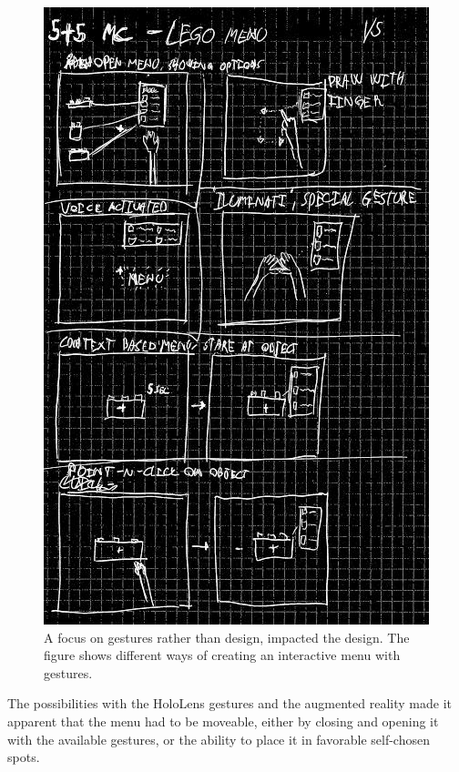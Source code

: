 \begin{figure}[t]
	\centering
	\includegraphics[width=0.7\linewidth]{figures/Menu/menu5}
	\caption{A focus on gestures rather than design, impacted the design. The figure shows different ways of creating an interactive menu with gestures.}
	\label{fig:menugesture}
\end{figure}
\par
The possibilities with the HoloLens gestures and the augmented reality made it apparent that the menu had to be moveable, either by closing and opening it with the available gestures, or the ability to place it in favorable self-chosen spots.
